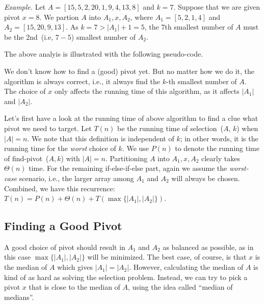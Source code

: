 \emph{Example.} Let $A = [15, 5, 2, 20, 1, 9, 4, 13, 8]$ and $k = 7$.
Suppose that we are given pivot $x = 8$. We partion $A$ into $A_1, x, A_2$,
where $A_1 = [5, 2, 1, 4]$ and $A_2 = [15, 20, 9, 13]$.
As $k = 7 > |A_1| + 1 = 5$, the 7th smallest number of $A$
must be the 2nd~(i.e, $7-5$) smallest number of $A_2$.

The above analyis is illustrated with the following pseudo-code.

\begin{algorithmblock}[0.8\textwidth]
	\xxx
	\aab {\textcolor{blue}{$x$ = find-pivot~($A$)};}\xxx
	\xxx
	\xxx
	\xxx
	\xxx
	\xxx
	\xxx
\end{algorithmblock}

We don't know how to find a (good) pivot yet.
But no matter how we do it, the algorithm is always correct, i.e., it always find the $k$-th smallest number of $A$.
The choice of $x$ only affects the running time of this algorithm, as it affects $|A_1|$ and $|A_2|$.


Let's first have a look at the running time
of above algorithm to find a clue what pivot we need to target.
Let $T(n)$ be the running time of selection~($A$, $k$) when $|A| = n$. We note that this definition is independent of $k$;
in other words, it is the running time for the \emph{worst} choice of $k$.
We use $P(n)$ to denote the running time of find-pivot~($A,k$) with $|A| = n$.
Partitioning $A$ into $A_1,x,A_2$ clearly takes $\Theta(n)$ time.
For the remaining if-else-if-else part, again we assume the \emph{worst-case} scenario, i.e.,
the larger array among $A_1$ and $A_2$ will always be chosen.
Combined, we have this recurrence: $T(n) = P(n) + \Theta(n) + T(\max\{|A_1|, |A_2|\})$.

\subsection*{Finding a Good Pivot}

A good choice of pivot should result in $A_1$ and $A_2$ as balanced as possible, as in this case 
$\max\{|A_1|, |A_2|\}$ will be minimized. %
The best case, of course, is that $x$ is the median of $A$ which gives $|A_1| = |A_2|$. 
However, calculating the median of $A$ is kind of as hard as solving the selection problem.
Instead, we can try to pick a pivot $x$ that is close to the median of $A$, using the idea called ``median of medians''.

